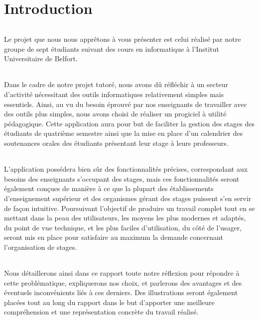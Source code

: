 \documentclass[a4paper,10pt]{report}
\begin{document}
\strut
\renewcommand{\contentsname}{Sommaire}
\tableofcontents

\part{Introduction}
  \paragraph{}
    Le projet que nous nous apprêtons à vous présenter est celui réalisé par notre groupe de sept étudiants suivant des cours en informatique à l'Institut Universitaire de Belfort.
    
  \paragraph{}
    Dans le cadre de notre projet tutoré, nous avons dû réfléchir à un secteur d'activité nécessitant des outils informatiques relativement simples mais essentiels. 
    Ainsi, au vu du besoin éprouvé par nos enseignants de travailler avec des outils plus simples, nous avons choisi de réaliser un progiciel à utilité pédagogique.
    Cette application aura pour but de faciliter la gestion des stages des étudiants de quatrième semestre ainsi que la mise en place d'un calendrier des soutenances orales des étudiants présentant leur stage à leurs professeurs.

  \paragraph{}
    L'application possédera bien sûr des fonctionnalités précises, correspondant aux besoins des enseignants s'occupant des stages, mais ces fonctionnalités seront également conçues de manière à ce que la plupart des établissements d'enseignement supérieur et des organismes gérant des stages puissent s'en servir de façon intuitive. 
    Poursuivant l'objectif de produire un travail complet tout en se mettant dans la peau des utilisateurs, les moyens les plus modernes et adaptés, du point de vue technique, et les plus faciles d'utilisation, du côté de l'usager, seront mis en place pour satisfaire au maximum la demande concernant l'organisation de stages. 

  \paragraph{}
    Nous détaillerons ainsi dans ce rapport toute notre réflexion pour répondre à cette problématique, expliquerons nos choix, et parlerons des avantages et des éventuels inconvénients liés à ces derniers.  
    Des illustrations seront également placées tout au long du rapport dans le but d'apporter une meilleure compréhension et une représentation concrète du travail réalisé.
    
\end{document}
